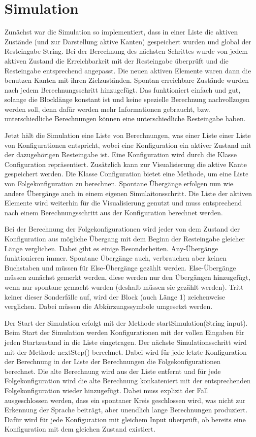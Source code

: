 \section{Simulation}
Zunächst war die Simulation so implementiert, dass in einer Liste die aktiven Zustände (und zur Darstellung aktive Kanten) gespeichert wurden und global der Resteingabe-String. Bei der Berechnung des nächsten Schrittes wurde von jedem aktiven Zustand die Erreichbarkeit mit der Resteingabe überprüft und die Resteingabe entsprechend angepasst. Die neuen aktiven Elemente waren dann die benutzen Kanten mit ihren Zielzuständen. Spontan erreichbare Zustände wurden nach jedem Berechnungsschritt hinzugefügt. Das funktioniert einfach und gut, solange die Blocklänge konstant ist und keine spezielle Berechnung nachvollzogen werden soll, denn dafür werden mehr Informationen gebraucht, bzw. unterschiedliche Berechnungen können eine unterschiedliche Resteingabe haben.

Jetzt hält die Simulation eine Liste von Berechnungen, was einer Liste einer Liste von Konfigurationen entspricht, wobei eine Konfiguration ein aktiver Zustand mit der dazugehörigen Resteingabe ist. Eine Konfiguration wird durch die Klasse Configuration repräsentiert. Zusätzlich kann zur Visualisierung die aktive Kante gespeichert werden. Die Klasse Configuration bietet eine Methode, um eine Liste von Folgekonfiguration zu berechnen. Spontane Übergänge erfolgen nun wie andere Übergänge auch in einem eigenen Simulaitonsschritt. Die Liste der aktiven Elemente wird weiterhin für die Visualisierung genutzt und muss entsprechend nach einem Berechnungsschritt aus der Konfiguration berechnet werden.

Bei der Berechnung der Folgekonfigurationen wird jeder von dem Zustand der Konfiguration aus mögliche Übergang mit dem Beginn der Resteingabe gleicher Länge verglichen. Dabei gibt es einige Besonderheiten. Any-Übergänge funktionieren immer. Spontane Übergänge auch, verbrauchen aber keinen Buchstaben und müssen für Else-Übergänge gezählt werden. Else-Übergänge müssen zunächst gemerkt werden, diese werden nur den Übergängen hinzugefügt, wenn nur spontane gemacht wurden (deshalb müssen sie gezählt werden). Tritt keiner dieser Sonderfälle auf, wird der Block (auch Länge 1) zeichenweise verglichen. Dabei müssen die Abkürzungssymbole umgesetzt werden.

Der Start der Simulation erfolgt mit der Methode startSimulation(String input). Beim Start der Simulation werden Konfigurationen mit der vollen Eingaben für jeden Startzustand in die Liste eingetragen. Der nächste Simulationsschritt wird mit der Methode nextStep() berechnet. Dabei wird für jede letzte Konfiguration der Berechnung in der Liste der Berechnungen die Folgekonfigurationen berechnet. Die alte Berechnung wird aus der Liste entfernt und für jede Folgekonfiguration wird die alte Berechnung konkateniert mit der entsprechenden Folgekonfiguration wieder hinzugefügt. Dabei muss explizit der Fall ausgeschlossen werden, dass ein spontaner Kreis geschlossen wird, was nicht zur Erkennung der Sprache beiträgt, aber unendlich lange Berechnungen produziert. Dafür wird für jede Konfiguration mit gleichem Input überprüft, ob bereits eine Konfiguration mit dem gleichen Zustand existiert.
